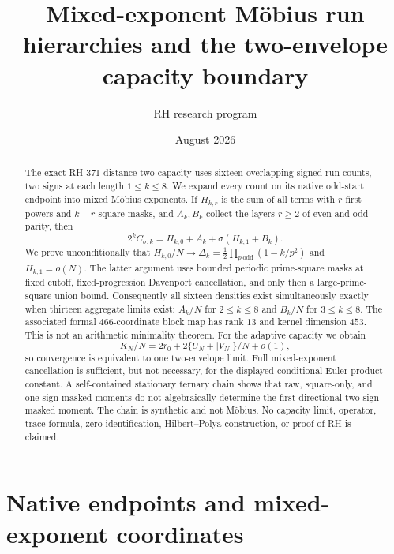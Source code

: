 \documentclass[11pt]{article}
\title{Mixed-exponent M\"obius run hierarchies and
the two-envelope capacity boundary}
\author{RH research program}
\date{August 2026}
\theoremstyle{definition}
\theoremstyle{remark}
\begin{document}
\maketitle

\begin{abstract}
The exact RH-371 distance-two capacity uses sixteen overlapping signed-run
counts, two signs at each length $1\le k\le8$.  We expand every count on its
native odd-start endpoint into mixed M\"obius exponents.  If $H_{k,r}$ is the
sum of all terms with $r$ first powers and $k-r$ square masks, and $A_k,B_k$
collect the layers $r\ge2$ of even and odd parity, then
\[
 2^kC_{\sigma,k}=H_{k,0}+A_k+
 \sigma(H_{k,1}+B_k).
\]
We prove unconditionally that
$H_{k,0}/N\to\Delta_k=\frac12\prod_{p\ \mathrm{odd}}(1-k/p^2)$ and
$H_{k,1}=o(N)$.  The latter argument uses bounded periodic prime-square
masks at fixed cutoff, fixed-progression Davenport cancellation, and only
then a large-prime-square union bound.  Consequently all sixteen densities
exist simultaneously exactly when thirteen aggregate limits exist:
$A_k/N$ for $2\le k\le8$ and $B_k/N$ for $3\le k\le8$.  The associated
formal $466$-coordinate block map has rank $13$ and kernel dimension $453$.
This is not an arithmetic minimality theorem.  For the adaptive capacity we
obtain
\[
 K_N/N=2r_0+2\{U_N+|V_N|\}/N+o(1),
\]
so convergence is equivalent to one two-envelope limit.  Full
mixed-exponent cancellation is sufficient, but not necessary, for the
displayed conditional Euler-product constant.  A self-contained stationary
ternary chain shows that raw, square-only, and one-sign masked moments do
not algebraically determine the first directional two-sign masked moment.
The chain is synthetic and not M\"obius.  No capacity limit, operator,
trace formula, zero identification, Hilbert--Polya construction, or proof
of RH is claimed.
\end{abstract}

\section{Native endpoints and mixed-exponent coordinates}
\end{document}
